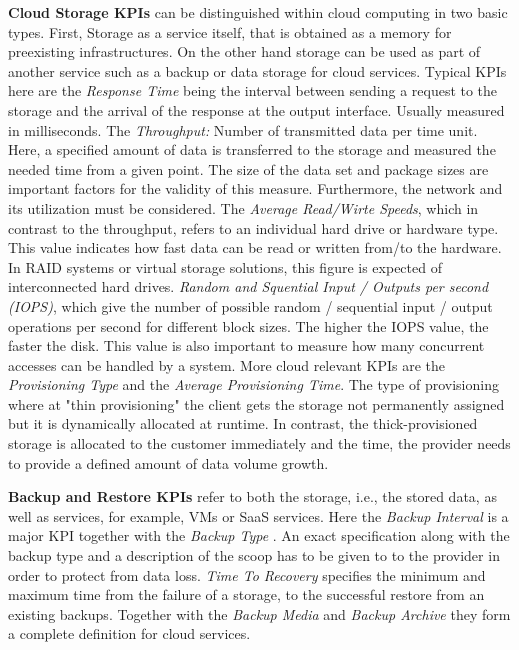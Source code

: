 \textbf{Cloud Storage KPIs} can be distinguished within cloud computing in two basic types. First, Storage as a service itself, that is obtained as a memory for preexisting infrastructures. On the other hand storage can be used as part of another service such as a backup or data storage for cloud services. Typical KPIs here are the \emph{Response Time} being the interval between sending a request to the storage and the arrival of the response at the output interface. Usually measured in milliseconds. The \emph{Throughput:} Number of transmitted data per time unit. Here, a specified amount of data is transferred to the storage and measured the needed time from a given point. The size of the data set and package sizes are important factors for the validity of this measure. Furthermore, the network and its utilization must be considered. The \emph{Average Read/Wirte Speeds}, which in contrast to the throughput,  refers to an individual hard drive or hardware type. This value indicates how fast data can be read or written from/to the hardware. In RAID systems or virtual storage solutions, this figure is expected of interconnected hard drives. \emph{Random and Squential Input / Outputs per second (IOPS)}, which give the number of possible random / sequential  input / output operations per second for different block sizes. The higher the IOPS value, the faster the disk. This value is also important to measure how many concurrent accesses can be handled by a system. More cloud relevant KPIs are the \emph{Provisioning Type} and the \emph{Average Provisioning Time}. The type of provisioning where at "thin provisioning" the client gets the storage not permanently assigned but it is dynamically allocated at runtime. In contrast, the thick-provisioned storage is allocated to the customer immediately and the time, the provider needs to provide a defined amount of data volume growth. 
 
\textbf{Backup and Restore KPIs }refer to both the storage, i.e., the stored data, as well as services, for example, VMs or SaaS services. Here the \emph{Backup Interval} is a major KPI together with the \emph{Backup Type} . An exact specification along with the backup type and a description of the scoop has to be given to to the provider in order to protect from data loss. \emph{Time To Recovery} specifies the minimum and maximum time from the failure of a storage, to the successful restore from an existing backups. Together with the \emph{Backup Media} and \emph{Backup Archive}  they form a complete definition for cloud services.

